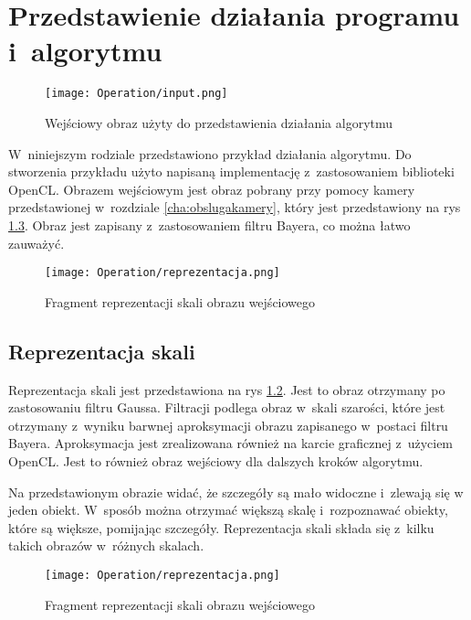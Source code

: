 \chapter{Przedstawienie działania programu i~algorytmu}
\label{cha:dzialanie}

\begin{figure}[h]
\begin{center}
\texttt{[image: Operation/input.png]}
\end{center}
\caption{Wejściowy obraz użyty do przedstawienia działania algorytmu}
\label{fig:input}
\end{figure}

W~niniejszym rodziale przedstawiono przykład działania algorytmu. Do stworzenia przykładu użyto napisaną implementację z~zastosowaniem biblioteki OpenCL. Obrazem wejściowym jest obraz pobrany przy pomocy kamery przedstawionej w~rozdziale \ref{cha:obslugakamery}, który jest przedstawiony na rys \ref{fig:input}. Obraz jest zapisany z~zastosowaniem filtru Bayera, co można łatwo zauważyć.

\begin{figure}[h]
\begin{center}
\texttt{[image: Operation/reprezentacja.png]}
\end{center}
\caption{Fragment reprezentacji skali obrazu wejściowego}
\label{fig:dzialanieRep}
\end{figure}


\section{Reprezentacja skali}
\label{sec:dzialanieRep}

Reprezentacja skali jest przedstawiona na rys \ref{fig:dzialanieRep}. Jest to obraz otrzymany po zastosowaniu filtru Gaussa. Filtracji podlega obraz w~skali szarości, które jest otrzymany z~wyniku barwnej aproksymacji obrazu zapisanego w~postaci filtru Bayera. Aproksymacja jest zrealizowana również na karcie graficznej z~użyciem OpenCL. Jest to również obraz wejściowy dla dalszych kroków algorytmu.

Na przedstawionym obrazie widać, że szczegóły są mało widoczne i~zlewają się w jeden obiekt. W~sposób można otrzymać większą skalę i~rozpoznawać obiekty, które są większe, pomijając szczegóły. Reprezentacja skali składa się z~kilku takich obrazów w~różnych skalach.

\begin{figure}[h]
\begin{center}
\texttt{[image: Operation/reprezentacja.png]}
\end{center}
\caption{Fragment reprezentacji skali obrazu wejściowego}
\label{fig:input}
\end{figure}

